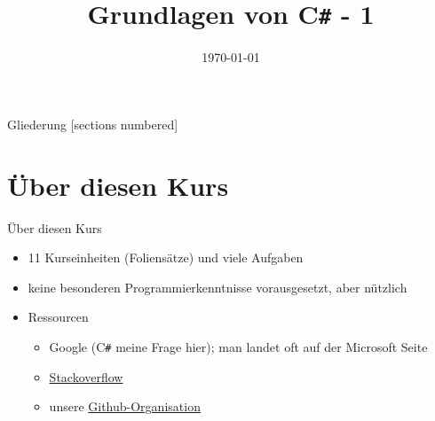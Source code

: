 



\title{Grundlagen von C\texttt{\#} - 1}
\date{\today}




\maketitle

\begin{frame}{Gliederung}
	[sections numbered]
	\tableofcontents
\end{frame}

\section{Über diesen Kurs}
\begin{frame}{Über diesen Kurs}
	\begin{itemize}
		\item 11 Kurseinheiten (Foliensätze) und viele Aufgaben
		\item keine besonderen Programmierkenntnisse vorausgesetzt, aber nützlich
		\item Ressourcen
		\begin{itemize}
			\item Google (C\texttt{\#} meine Frage hier); man landet oft auf der Microsoft Seite
			\item \href{http://stackoverflow.com/}{Stackoverflow}
			\item unsere \href{https://github.com/fsr}{Github-Organisation}
		\end{itemize}
	\end{itemize}
\end{frame}


